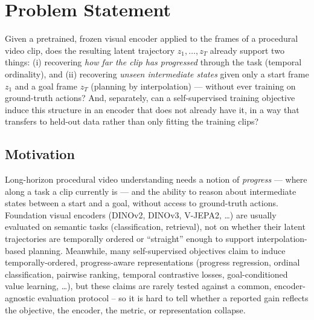 \section{Problem Statement}
\label{sec:problem-statement}

Given a pretrained, frozen visual encoder applied to the frames of a procedural video
clip, does the resulting latent trajectory $z_1, \dots, z_T$ already support two
things: (i) recovering \emph{how far the clip has progressed} through the task
(temporal ordinality), and (ii) recovering \emph{unseen intermediate states} given only
a start frame $z_1$ and a goal frame $z_T$ (planning by interpolation) --- without ever
training on ground-truth actions? And, separately, can a self-supervised training
objective induce this structure in an encoder that does not already have it, in a way
that transfers to held-out data rather than only fitting the training clips?


\subsection{Motivation}
Long-horizon procedural video understanding needs a notion of \emph{progress} --- where
along a task a clip currently is --- and the ability to reason about intermediate states
between a start and a goal, without access to ground-truth actions. Foundation visual
encoders (DINOv2, DINOv3, V-JEPA2, \ldots) are usually evaluated on semantic tasks
(classification, retrieval), not on whether their latent trajectories are temporally
ordered or ``straight'' enough to support interpolation-based planning. Meanwhile, many
self-supervised objectives claim to induce temporally-ordered, progress-aware
representations (progress regression, ordinal classification, pairwise ranking,
temporal contrastive losses, goal-conditioned value learning, \ldots), but these claims
are rarely tested against a common, encoder-agnostic evaluation protocol -- so it is
hard to tell whether a reported gain reflects the objective, the encoder, the metric, or
representation collapse.

